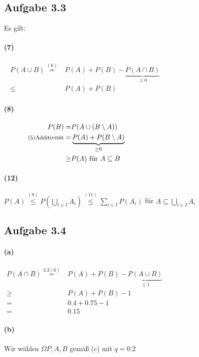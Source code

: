 \documentclass[10pt, a4paper]{article}
\begin{document}
\subsection{Aufgabe 3.3}
Es gilt:
\paragraph*{(7)}
\begin{align*}
	P(A\cup B)\stackrel{(6)}{=}&P(A)+P(B)-\underbrace{P(A\cap B)}_{\geq0}	\hspace{150pt}\\
	\leq&P(A)+P(B)
\end{align*}
\paragraph*{(8)}
\begin{align*}
	P(B)=&P(A\cup(B\setminus A))	\\
	\text{\footnotesize(5)Additivität}=&\underbrace{P(A)+P(B\setminus A)}_{\geq0}	\hspace{150pt}\\
	\geq&P(A) \text{ für }A\subseteq B
\end{align*}
\paragraph*{(12)}
	$P(A)\stackrel{(8)}{\leq}P(\underset{i\in I}{\bigcup}A_{i})\stackrel{(11)}{\leq}\sum_{i\in I}P(A_{i})$ für $A\subseteq \underset{i\in I}{\bigcup}A_{i}$



\subsection{Aufgabe 3.4}
\paragraph{(a)}
\begin{align*}
	P(A\cap B)\stackrel{3.3(6)}{=}&P(A)+P(B)-\underbrace{P(A\cup B)}_{\leq1}	\hspace{200pt}\\
	\geq&P(A)+P(B)-1	\\
	=&0.4+0.75-1	\\
	=&0.15
\end{align*}
\paragraph*{(b)}Wir wählen $\Omega P,A,B$ gemäß (c) mit $q=0.2$
\end{document}
